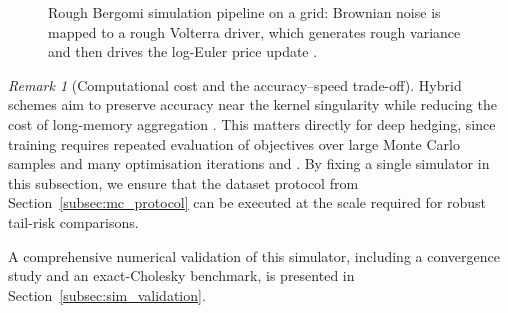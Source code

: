\documentclass[12pt,a4paper]{article}
\theoremstyle{definition}
\theoremstyle{plain}
\theoremstyle{remark}
\newtheorem{remark}{Remark}[section]
\theoremstyle{plain}
\begin{document}
\begin{figure}[H]
\centering
{}
\caption{Rough Bergomi simulation pipeline on a grid: Brownian noise is mapped to a rough Volterra driver, which generates rough variance and then drives the log-Euler price update \cite{BayerFriz2016}.}
\label{fig:rb_pipeline}
\end{figure}
\FloatBarrier

\begin{remark}[Computational cost and the accuracy--speed trade-off]
\label{rem:rb_cost_tradeoff}
Hybrid schemes aim to preserve accuracy near the kernel singularity while reducing the cost of long-memory aggregation \cite{BayerFriz2016}.
This matters directly for deep hedging, since training requires repeated evaluation of objectives over large Monte Carlo samples and many optimisation iterations \cite{Buehler2019DeepHedging} and \cite{Horvath2021DeepRough}.
By fixing a single simulator in this subsection, we ensure that the dataset protocol from Section~\ref{subsec:mc_protocol} can be executed at the scale required for robust tail-risk comparisons.
\end{remark}

A comprehensive numerical validation of this simulator, including a
convergence study and an exact-Cholesky benchmark, is presented in
Section~\ref{subsec:sim_validation}.
\end{document}
